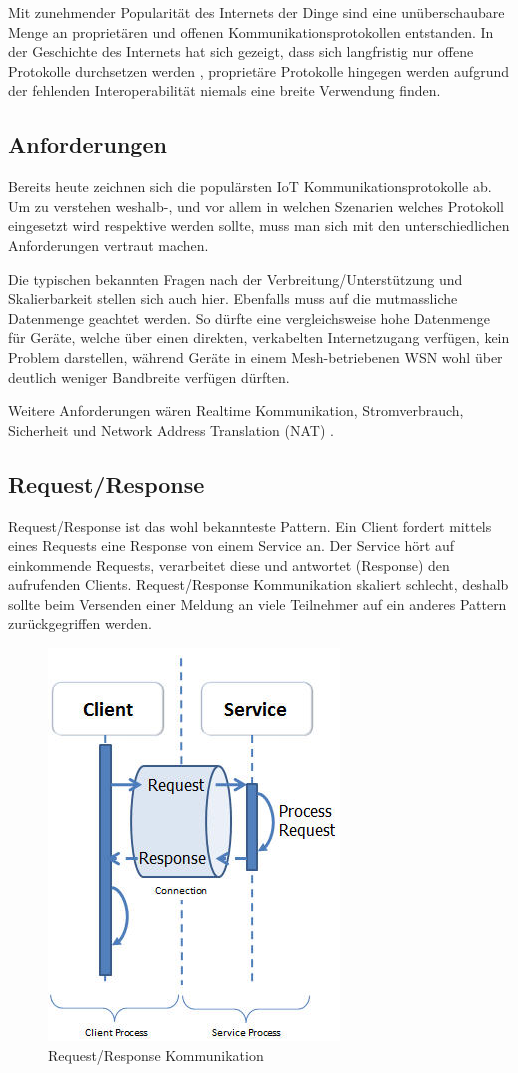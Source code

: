Mit zunehmender Popularität des Internets der Dinge sind eine unüberschaubare Menge an proprietären und offenen Kommunikationsprotokollen entstanden. In der Geschichte des Internets hat sich gezeigt, dass sich langfristig nur offene Protokolle durchsetzen werden \cite{Obermaier14}, proprietäre Protokolle hingegen werden aufgrund der fehlenden Interoperabilität niemals eine breite Verwendung finden.
\subsection{Anforderungen}
Bereits heute zeichnen sich die populärsten IoT Kommunikationsprotokolle ab. Um zu verstehen weshalb-, und vor allem in welchen Szenarien welches Protokoll eingesetzt wird respektive werden sollte, muss man sich mit den unterschiedlichen Anforderungen vertraut machen.

Die typischen bekannten Fragen nach der Verbreitung/Unterstützung und Skalierbarkeit stellen sich auch hier. Ebenfalls muss auf die mutmassliche Datenmenge geachtet werden. So dürfte eine vergleichsweise hohe Datenmenge für Geräte, welche über einen direkten, verkabelten Internetzugang verfügen, kein Problem darstellen, während Geräte in einem Mesh-betriebenen WSN wohl über deutlich weniger Bandbreite verfügen dürften.

Weitere Anforderungen wären Realtime Kommunikation, Stromverbrauch, Sicherheit und Network Address Translation (NAT) \cite{Obermaier15}.
\subsection{Request/Response}
Request/Response ist das wohl bekannteste Pattern. Ein Client fordert mittels eines Requests eine Response von einem Service an. Der Service hört auf einkommende Requests, verarbeitet diese und antwortet (Response) den aufrufenden Clients. Request/Response Kommunikation skaliert schlecht, deshalb sollte beim Versenden einer Meldung an viele Teilnehmer auf ein anderes Pattern zurückgegriffen werden. 
\begin{figure}[H]
\centering
\includegraphics[scale=0.8]{../02_Analyse/images/request-response.png}
\caption{Request/Response Kommunikation \cite{ReqRes}}
\end{figure}
